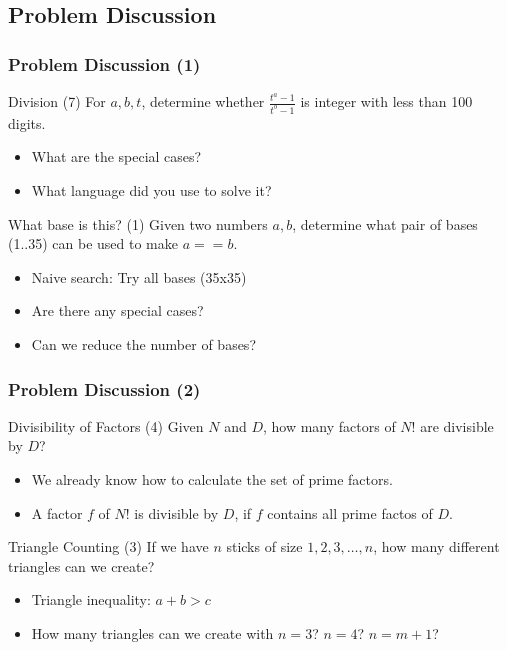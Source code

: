 \documentclass{beamer}
\begin{document}
\subsection{Problem Discussion}
\begin{frame}
  \frametitle{Problem Discussion (1)}

  \begin{block}{Division (7)}
    For $a,b,t$, determine whether $\frac{t^a-1}{t^b-1}$ is integer
    with less than 100 digits.

    \bigskip

    \begin{itemize}
    \item What are the special cases?
    \item What language did you use to solve it?
    \end{itemize}
  \end{block}

  \begin{block}{What base is this? (1)}
    Given two numbers $a,b$, determine what pair of bases (1..35) can
    be used to make $a==b$.

    \begin{itemize}
    \item Naive search: Try all bases (35x35)
    \item Are there any special cases?
    \item Can we reduce the number of bases?
    \end{itemize}
  \end{block}
\end{frame}

\begin{frame}
  \frametitle{Problem Discussion (2)}
  \begin{block}{Divisibility of Factors (4)}
    Given $N$ and $D$, how many factors of $N!$ are divisible by $D$?

    \begin{itemize}
    \item We already know how to calculate the set of prime factors.
    \item A factor $f$ of $N!$ is divisible by $D$, if $f$ contains
      all prime factos of $D$.
    \end{itemize}
  \end{block}

  \begin{block}{Triangle Counting (3)}
    If we have $n$ sticks of size $1,2,3,\ldots,n$, how many different
    triangles can we create?

    \begin{itemize}
    \item Triangle inequality: $a+b > c$
    \item How many triangles can we create with $n = 3$? $n = 4$? $n =
      m+1$?
    \end{itemize}
  \end{block}
\end{frame}
\end{document}
